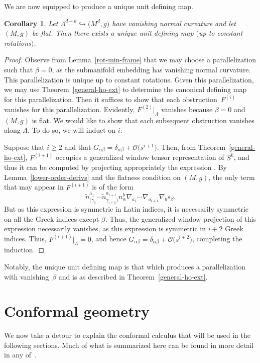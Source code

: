 \documentclass[10pt,a4paper]{article}
\numberwithin{equation}{section}
\newtheorem{Corollary}[Theorem]{Corollary}
\renewcommand{\=}{\stackrel \Lambda =}
\begin{document}
We are now equipped to produce a unique unit defining map.
\begin{Corollary}
Let $\Lambda^{d-k} \hookrightarrow \bigl(M^d,g\bigr)$ have vanishing normal curvature and let $(M,g)$ be flat. Then there exists a unique unit defining map $($up to constant rotations$)$.
\end{Corollary}
\begin{proof}
Observe from Lemma~\ref{rot-min-frame} that we may choose a parallelization such that $\beta = 0$, as the submanifold embedding has vanishing normal curvature. This parallelization is unique up to constant rotations. Given this parallelization, we may use Theorem~\ref{general-ho-ext} to determine the canonical defining map for this parallelization. Then it suffices to show that each obstruction~$F^{(i)}$ vanishes for this parallelization. Evidently, $F^{(2)}|_{\Lambda}$ vanishes because $\beta = 0$ and $(M,g)$ is flat. We would like to show that each subsequent obstruction vanishes along $\Lambda$. To do so, we will induct on $i$.

Suppose that $i \geq 2$ and that $G_{\alpha \beta} = \delta_{\alpha \beta} + \mathcal{O}\bigl(s^{i+1}\bigr)$. Then, from Theorem~\ref{general-ho-ext}, $F^{(i+1)}$ occupies a generalized window tensor representation of $S^k$, and thus it can be computed by projecting appropriately the expression . By Lemma~\ref{lower-order-derivs} and the flatness condition on $(M,g)$, the only term that may appear in $F^{(i+1)}$ is of the form
\[
\tilde{n}^{a_1}_{(\gamma_1} \cdots \tilde{n}^{a_{i+1}}_{\gamma_{i+1})} n^b_{\alpha} \nabla_{a_1} \cdots \nabla_{a_{i+1}} \nabla_b s_{\beta} .
\]
But as this expression is symmetric in Latin indices, it is necessarily symmetric on all the Greek indices except $\beta$. Thus, the generalized window projection of this expression necessarily vanishes, as this expression is symmetric in $i+2$ Greek indices. Thus, $F^{(i+1)}|_{\Lambda} = 0$, and hence $G_{\alpha \beta} = \delta_{\alpha \beta} + \mathcal{O}\bigl(s^{i+2}\bigr)$, completing the induction.
\end{proof}

Notably, the unique unit defining map is that which produces a parallelization with vanishing~$\beta$ and is as described in Theorem~\ref{general-ho-ext}.

\section{Conformal geometry}\label{conf-geom-sec}
We now take a detour to explain the conformal calculus that will be used in the following sections. Much of what is summarized here can be found in more detail in any of~\cite{BEG,CapGover1999,CapGover2003,GOpet,GW}.
\end{document}
